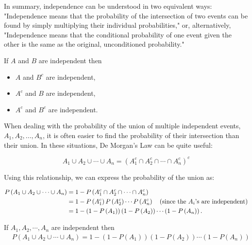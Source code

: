 In summary, independence can be understood in two equivalent ways: "Independence means that the probability of the intersection of two events can be found by simply multiplying their individual probabilities," or, alternatively, "Independence means that the conditional probability of one event given the other is the same as the original, unconditioned probability."

\begin{lemma}
If $A$ and $B$ are independent then
\begin{itemize}
    \item $A$ and $B^c$ are independent,
    \item $A^c$ and $B$ are independent,
    \item $A^c$ and $B^c$ are independent.
\end{itemize}
\end{lemma}

When dealing with the probability of the union of multiple independent events, \( A_1, A_2, \ldots, A_n \), it is often easier to find the probability of their intersection than their union. In these situations, De Morgan's Law can be quite useful:

\[
A_1 \cup A_2 \cup \cdots \cup A_n = \left(A_1^c \cap A_2^c \cap \cdots \cap A_n^c\right)^c
\]

Using this relationship, we can express the probability of the union as:

\begin{align*}
P\left(A_1 \cup A_2 \cup \cdots \cup A_n\right) &= 1 - P\left(A_1^c \cap A_2^c \cap \cdots \cap A_n^c\right) \\
&= 1 - P\left(A_1^c\right) P\left(A_2^c\right) \cdots P\left(A_n^c\right) \quad \text{(since the \( A_i \)'s are independent)} \\
&= 1 - \left(1 - P\left(A_1\right)\right)\left(1 - P\left(A_2\right)\right) \cdots \left(1 - P\left(A_n\right)\right).
\end{align*}


\begin{theorem}
        If \( A_1, A_2, \cdots, A_n \) are independent then
        \begin{align*}
        &P\left(A_1 \cup A_2 \cup \cdots \cup A_n\right)=1-\left(1-P\left(A_1\right)\right)\left(1-P\left(A_2\right)\right) \cdots\left(1-P\left(A_n\right)\right)
        \end{align*}
\end{theorem}

